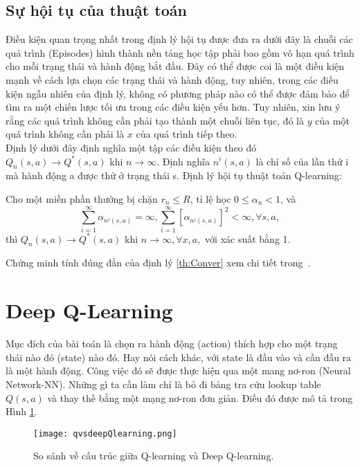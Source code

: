 \subsection{Sự hội tụ của thuật toán}
Điều kiện quan trọng nhất trong định lý hội tụ được đưa ra dưới đây là chuỗi các quá trình (Episodes) hình thành nền tảng học tập phải 
bao gồm vô hạn quá trình cho mỗi trạng thái và hành động bắt đầu. Đây có thể được coi là một điều kiện mạnh về cách lựa chọn các 
trạng thái và hành động, tuy nhiên, trong các điều kiện ngẫu nhiên của định lý, không có phương pháp nào có thể được đảm bảo 
để tìm ra một chiến lược tối ưu trong các điều kiện yếu hơn. Tuy nhiên, xin lưu ý rằng các quá trình không cần phải tạo thành một 
chuỗi liên tục, đó là $y$ của một quá trình không cần phải là $x$ của quá trình tiếp theo.\\
\indent Định lý dưới đây định nghĩa một tập các điều kiện theo đó $Q_n(s,a) \to Q^{*}(s,a)$ khi $n \to \infty$. 
Định nghĩa $n^{i}(s, a)$ là chỉ số của lần thứ i mà hành động a được thử ở trạng thái s.
Định lý hội tụ thuật toán Q-learning:
\begin{theorem}
    \label{th:Conver}
    Cho một miền phần thưởng bị chặn $r_n \leq R$, tỉ lệ học $0 \leq \alpha_n < 1$, và
    \begin{equation}
        \sum_{i=1}^{\infty}\alpha_{n^{i}(s,a)} = \infty, \sum_{i=1}^{\infty}[\alpha_{n^{i}(s,a)}]^2 < \infty, \forall s, a,
    \end{equation} 
    thì $Q_n(s,a) \to Q^{*}(s,a)$ khi $n \to \infty, \forall x, a,$ với xác suất bằng 1.
\end{theorem}
Chứng minh tính đúng đắn của định lý \ref{th:Conver} xem chi tiết trong~\cite{Watkins1992}.
\section{Deep Q-Learning}
Mục đích của bài toán là chọn ra hành động (action) thích hợp cho một trạng thái nào đó (state) 
nào đó. Hay nói cách khác, với state là đầu vào và cần đầu ra là một hành động. 
Công việc đó sẽ được thực hiện qua một mang nơ-ron (Neural Network-NN). Những gì ta cần làm 
chỉ là bỏ đi  bảng tra cứu lookup table $Q(s,a)$ và thay thế bằng một mạng nơ-ron đơn giản. 
Điều đó được mô tả trong Hình \ref{fig:qlearning}.
\begin{figure}[ht]
    \centering
    \texttt{[image: qvsdeepQlearning.png]}
    \caption{So sánh về cấu trúc giữa Q-learning và Deep Q-learning.}
    \label{fig:qlearning}
\end{figure}

